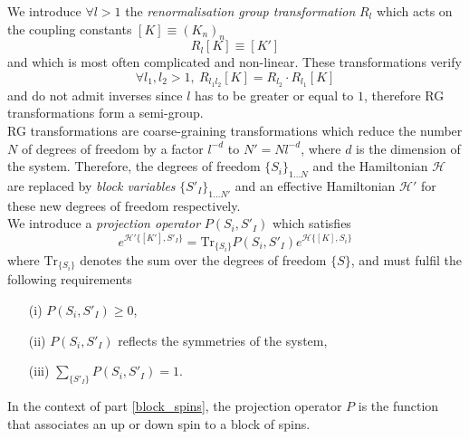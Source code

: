 \documentclass[class=report, float=false, crop=false]{standalone}
\begin{document}
We introduce $\forall l>1$ the \textit{renormalisation group transformation} $R_l$ which acts on the coupling constants $[K] \equiv (K_n)_n$
\begin{equation}
R_l[K] \equiv [K']
\end{equation}
and which is most often complicated and non-linear. These transformations verify
\begin{equation}
\forall l_1, l_2 > 1,~ R_{l_1l_2}[K]=R_{l_2}\cdot R_{l_1}[K]
\label{semi_group}
\end{equation}
and do not admit inverses since $l$ has to be greater or equal to $1$, therefore RG transformations form a semi-group.\\

RG transformations are coarse-graining transformations which reduce the number $N$ of degrees of freedom by a factor $l^{-d}$ to $N'=Nl^{-d}$, where $d$ is the dimension of the system. Therefore, the degrees of freedom $\{S_i\}_{1\ldots N}$ and the Hamiltonian $\mathcal{H}$ are replaced by \textit{block variables} $\{S'_I\}_{1\ldots N'}$ and an effective Hamiltonian $\mathcal{H'}$ for these new degrees of freedom respectively.\\

We introduce a \textit{projection operator} $P(S_i,S'_I)$ which satisfies
\begin{equation}
e^{\mathcal{H}'\{[K'],S'_I\}} = \text{Tr}_{\{S_i\}}P(S_i,S'_I)e^{\mathcal{H}\{[K],S_i\}}
\end{equation}
where $\text{Tr}_{\{S_i\}}$ denotes the sum over the degrees of freedom $\{S\}$, and must fulfil the following requirements
\begin{itemize}
\item[(i)] $P(S_i,S'_I) \ge 0$,
\item[(ii)] $P(S_i,S'_I)$ reflects the symmetries of the system,
\item[(iii)] $\sum_{\{S'_I\}} P(S_i,S'_I) = 1$.
\end{itemize}
In the context of part \ref{block_spins}, the projection operator $P$ is the function that associates an up or down spin to a block of spins.\\

\end{document}
